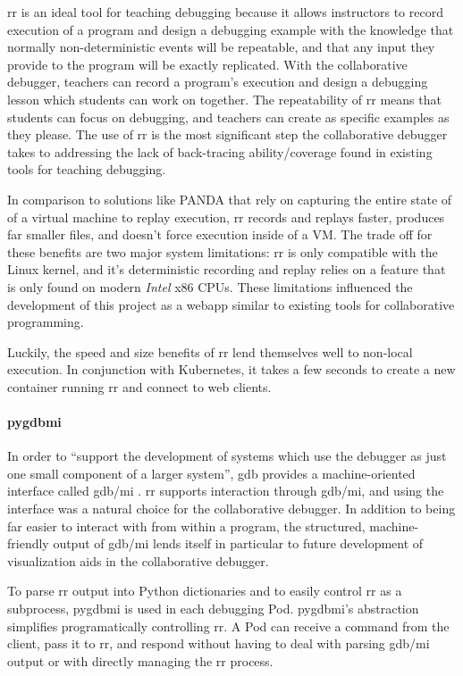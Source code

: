 \documentclass[12pt]{article}
\begin{document}
rr is an ideal tool for teaching debugging because it allows
instructors to record execution of a program and design a debugging
example with the knowledge that normally non-deterministic events will
be repeatable, and that any input they provide to the program will be
exactly replicated.  With the collaborative debugger, teachers can
record a program's execution and design a debugging lesson which
students can work on together.  The repeatability of rr means that
students can focus on debugging, and teachers can create as specific
examples as they please.  The use of rr is the most significant step
the collaborative debugger takes to addressing the lack of
back-tracing ability/coverage found in existing tools for teaching
debugging\cite{10.1145/3286960.3286970}.

In comparison to solutions like PANDA\cite{10.1145/2843859.2843867}
that rely on capturing the entire state of of a virtual machine to
replay execution, rr records and replays faster, produces far smaller
files, and doesn't force execution inside of a
VM.\cite{DBLP:journals/corr/OCallahanJFHNP17} The trade off for these
benefits are two major system limitations: rr is only compatible with
the Linux kernel, and it's deterministic recording and replay relies
on a feature that is only found on modern \textit{Intel} x86 CPUs.
These limitations influenced the development of this project as a
webapp similar to existing tools for collaborative programming.
\par

Luckily, the speed and size benefits of rr lend themselves well to
non-local execution.  In conjunction with Kubernetes, it takes a few
seconds to create a new container running rr and connect to web
clients.

\paragraph{pygdbmi}

In order to ``support the development of systems which use the
debugger as just one small component of a larger system'', gdb
provides a machine-oriented interface called gdb/mi \cite{gdbman}. rr
supports interaction through gdb/mi, and using the interface was a
natural choice for the collaborative debugger.  In addition to being
far easier to interact with from within a program, the structured,
machine-friendly output of gdb/mi lends itself in particular to future
development of visualization aids in the collaborative debugger.
\par
To parse rr output into Python dictionaries and to easily control rr
as a subprocess, pygdbmi \cite{pygdbmi} is used in each debugging Pod.
pygdbmi's abstraction simplifies programatically controlling rr.  A
Pod can receive a command from the client, pass it to rr, and respond
without having to deal with parsing gdb/mi output or with directly
managing the rr process.
\end{document}
